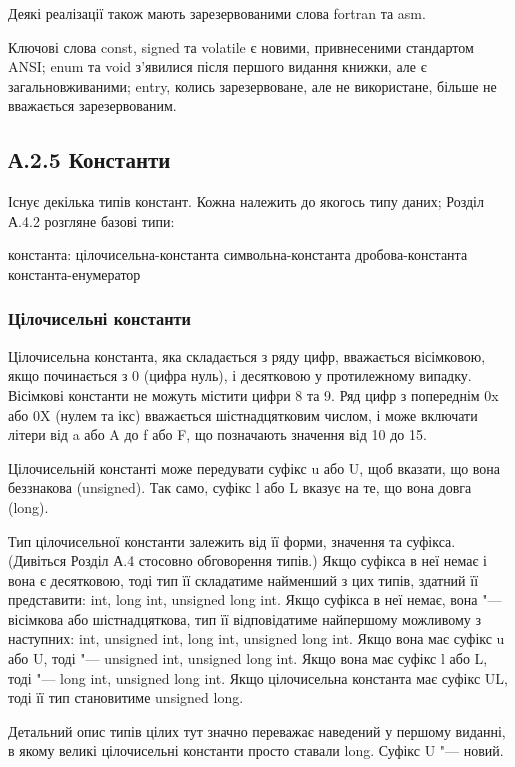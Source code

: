 \documentclass[a4paper,12pt]{book}
\begin{document}
  Деякі реалізації також мають зарезервованими слова fortran та asm.

  Ключові слова const, signed та volatile є новими, привнесеними стандартом
  ANSI; enum та void з'явилися після першого видання книжки, але є
  загальновживаними; entry, колись зарезервоване, але не використане, більше не
  вважається зарезервованим.

\subsection{А.2.5 Константи}


  Існує декілька типів констант. Кожна належить до якогось типу даних; Розділ А.4.2
  розгляне базові типи:

  константа: цілочисельна-константа символьна-константа дробова-константа
  константа-енумератор

\subsubsection{Цілочисельні константи}


  Цілочисельна константа, яка складається з ряду цифр, вважається вісімковою, якщо
  починається з 0 (цифра нуль), і десятковою у протилежному випадку. Вісімкові константи
  не можуть містити цифри 8 та 9. Ряд цифр з попереднім 0x або 0X (нулем та ікс)
  вважається шістнадцятковим числом, і може включати літери від a або A до f або F, що
  позначають значення від 10 до 15.

  Цілочисельній константі може передувати суфікс u або U, щоб вказати, що вона
  беззнакова (unsigned). Так само, суфікс l або L вказує на те, що вона довга (long).

  Тип цілочисельної константи залежить від її форми, значення та суфікса. (Дивіться
  Розділ А.4 стосовно обговорення типів.) Якщо суфікса в неї немає і вона є десятковою,
  тоді тип її складатиме найменший з цих типів, здатний її представити: int, long int,
  unsigned long int. Якщо суфікса в неї немає, вона "--- вісімкова або шістнадцяткова, тип
  її відповідатиме найпершому можливому з наступних: int, unsigned int, long int,
  unsigned long int. Якщо вона має суфікс u або U, тоді "--- unsigned int, unsigned long
  int. Якщо вона має суфікс l або L, тоді "--- long int, unsigned long int. Якщо
  цілочисельна константа має суфікс UL, тоді її тип становитиме unsigned long.

  Детальний опис типів цілих тут значно переважає наведений у першому виданні, в якому
  великі цілочисельні константи просто ставали long. Суфікс U "--- новий.
\end{document}
